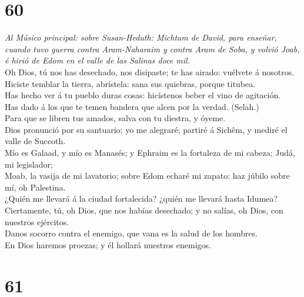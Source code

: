 \hypertarget{section-59}{%
\section{60}\label{section-59}}

 \emph{Al Músico principal: sobre Susan-Heduth: Michtam de
David, para enseñar, cuando tuvo guerra contra Aram-Naharaim y contra
Aram de Soba, y volvió Joab, é hirió de Edom en el valle de las Salinas
doce mil.}\\
Oh Dios, tú nos has desechado, nos disipaste; te has airado: vuélvete á
nosotros.\\
 Hiciste temblar la tierra, abrístela: sana sus quiebras,
porque titubea.\\
 Has hecho ver á tu pueblo duras cosas: hicístenos beber el
vino de agitación.\\
 Has dado á los que te temen bandera que alcen por la
verdad. (Selah.)\\
 Para que se libren tus amados, salva con tu diestra, y
óyeme.\\
 Dios pronunció por su santuario; yo me alegraré; partiré á
Sichêm, y mediré el valle de Succoth.\\
 Mío es Galaad, y mío es Manasés; y Ephraim es la fortaleza
de mi cabeza; Judá, mi legislador;\\
 Moab, la vasija de mi lavatorio; sobre Edom echaré mi
zapato: haz júbilo sobre mí, oh Palestina.\\
 ¿Quién me llevará á la ciudad fortalecida? ¿quién me
llevará hasta Idumea?\\
 Ciertamente, tú, oh Dios, que nos habías desechado; y no
salías, oh Dios, con nuestros ejércitos.\\
 Danos socorro contra el enemigo, que vana es la salud de
los hombres.\\
 En Dios haremos proezas; y él hollará nuestros enemigos.

\hypertarget{section-60}{%
\section{61}\label{section-60}}

